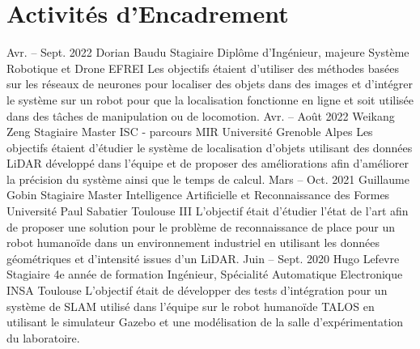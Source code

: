 \documentclass[11pt,a4paper,sans]{moderncv}         %
\begin{document}
\section{Activit\'es d'Encadrement}\label{act-encadrement}
\cventry
{Avr. -- Sept. 2022}
{Dorian Baudu}
{Stagiaire}
{Dipl\^ome d'Ing\'enieur, majeure Syst\`eme Robotique et Drone}
{EFREI}
{
  Les objectifs \'etaient d'utiliser des m\'ethodes bas\'ees sur les r\'eseaux de neurones pour localiser des objets dans des images et d'int\'egrer le syst\`eme sur un robot pour que la localisation fonctionne en ligne et soit utilis\'ee dans des t\^aches de manipulation ou de locomotion.
}
%
\cventry
{Avr. -- Ao\^ut 2022}
{Weikang Zeng}
{Stagiaire}
{Master ISC - parcours MIR}
{Universit\'e Grenoble Alpes}
{
  Les objectifs \'etaient d'\'etudier le syst\`eme de localisation d'objets utilisant des donn\'ees LiDAR d\'evelopp\'e dans l'\'equipe et de proposer des am\'eliorations afin d'am\'eliorer la pr\'ecision du syst\`eme ainsi que le temps de calcul.
}
%
\cventry
{Mars -- Oct. 2021}
{Guillaume Gobin}
{Stagiaire}
{Master Intelligence Artificielle et Reconnaissance des Formes}
{Universit\'e Paul Sabatier Toulouse III}
{
  L'objectif \'etait d'\'etudier l'\'etat de l'art afin de proposer une solution pour le probl\`eme de reconnaissance de place pour un robot humano\"ide dans un environnement industriel en utilisant les donn\'ees g\'eom\'etriques et d'intensit\'e issues d'un LiDAR.
}
%
\cventry
{Juin -- Sept. 2020}
{Hugo Lefevre}
{Stagiaire}
{4e ann\'ee de formation Ing\'enieur, Sp\'ecialit\'e Automatique Electronique}
{INSA Toulouse}
{
  L'objectif \'etait de d\'evelopper des tests d'int\'egration pour un syst\`eme de SLAM utilis\'e dans l'\'equipe sur le robot humano\"ide TALOS en utilisant le simulateur Gazebo et une mod\'elisation de la salle d'exp\'erimentation du laboratoire.
}
%
\end{document}
